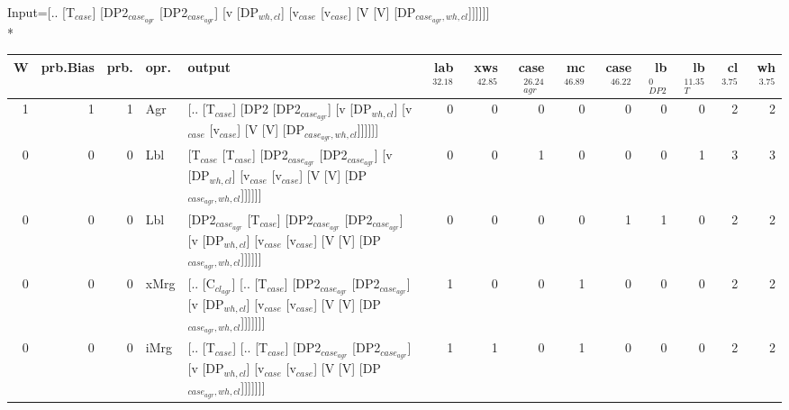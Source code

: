 \begingroup\scriptsize Input=[.. [T$_{case}$] [DP2$_{case_{agr}}$ [DP2$_{case_{agr}}$] [v [DP$_{wh,cl}$] [v$_{case}$ [v$_{case}$] [V [V] [DP$_{case_{agr},wh,cl}$]]]]]]\\*
\begin{tabularx}{\linewidth}{rrrlXrrrrrrrrr}
\hline
   W &   prb.Bias &   prb. & opr.   & output                                                                                                                                                                                                   &   lab$^{32.18}$ &   xws$^{42.85}$ &   case$_{agr}^{26.24}$ &   mc$^{46.89}$ &   case$^{46.22}$ &   lb$_{DP2}^{0}$ &   lb$_{T}^{11.35}$ &   cl$^{3.75}$ &   wh$^{3.75}$ \\
\hline
   1 &       1 &   1 & Agr  & [.. [T$_{case}$] [DP2 [DP2$_{case_{agr}}$] [v [DP$_{wh,cl}$] [v$_{case}$ [v$_{case}$] [V [V] [DP$_{case_{agr},wh,cl}$]]]]]]                                                                                                          &             0 &             0 &                  0 &            0 &              0 &            0 &              0 &        2 &        2 \\
   0 &       0 &   0 & Lbl  & [T$_{case}$ [T$_{case}$] [DP2$_{case_{agr}}$ [DP2$_{case_{agr}}$] [v [DP$_{wh,cl}$] [v$_{case}$ [v$_{case}$] [V [V] [DP$_{case_{agr},wh,cl}$]]]]]]                                                                                             &             0 &             0 &                  1 &            0 &              0 &            0 &              1 &        3 &        3 \\
   0 &       0 &   0 & Lbl  & [DP2$_{case_{agr}}$ [T$_{case}$] [DP2$_{case_{agr}}$ [DP2$_{case_{agr}}$] [v [DP$_{wh,cl}$] [v$_{case}$ [v$_{case}$] [V [V] [DP$_{case_{agr},wh,cl}$]]]]]]                                                                                       &             0 &             0 &                  0 &            0 &              1 &            1 &              0 &        2 &        2 \\
   0 &       0 &   0 & xMrg & [.. [C$_{cl_{agr}}$] [.. [T$_{case}$] [DP2$_{case_{agr}}$ [DP2$_{case_{agr}}$] [v [DP$_{wh,cl}$] [v$_{case}$ [v$_{case}$] [V [V] [DP$_{case_{agr},wh,cl}$]]]]]]]                                                                                 &             1 &             0 &                  0 &            1 &              0 &            0 &              0 &        2 &        2 \\
   0 &       0 &   0 & iMrg & [.. [T$_{case}$] [.. [T$_{case}$] [DP2$_{case_{agr}}$ [DP2$_{case_{agr}}$] [v [DP$_{wh,cl}$] [v$_{case}$ [v$_{case}$] [V [V] [DP$_{case_{agr},wh,cl}$]]]]]]]                                                                                   &             1 &             1 &                  0 &            1 &              0 &            0 &              0 &        2 &        2 \\

\end{tabularx}
